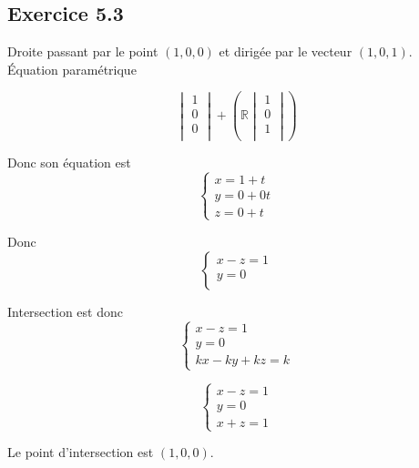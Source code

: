 \documentclass[]{book}
\theoremstyle{definition}
\newcommand{\bb}[1]{\mathbb{#1}}
\newcommand{\R}{\bb{R}}
\begin{document}
\subsection*{Exercice 5.3}
Droite passant par le point $(1,0,0)$ et dirig\'ee par le vecteur $(1,0,1)$. 
\'Equation param\'etrique 

$$
\begin{vmatrix}
    1 \\
    0 \\
    0 \\
\end{vmatrix}
+(\R
    \begin{vmatrix}
        1 \\
        0 \\
        1 \\
    \end{vmatrix}
)
$$

Donc son \'equation est 
$$
\left\{ 
    \begin{array}{l}
        x = 1 + t\\
        y = 0 + 0t\\
        z = 0 + t
    \end{array}
\right.
$$

Donc
$$
\left\{ 
    \begin{array}{l}
        x - z = 1 \\
        y = 0 \\
    \end{array}
\right.
$$

Intersection est donc
$$
\left\{ 
    \begin{array}{l}
        x - z = 1 \\
        y = 0 \\
        kx - ky + kz = k
    \end{array}
\right.
$$

$$
\left\{ 
    \begin{array}{l}
        x - z = 1 \\
        y = 0 \\
        x  + z = 1
    \end{array}
\right.
$$

Le point d'intersection est $(1,0,0)$.
\end{document}
